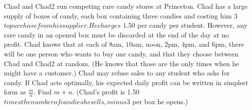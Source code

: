 Chad and Chad2 run competing rare candy stores at Princeton. Chad has a large supply of boxes of candy, each box containing three candies and costing him $ $3$ to purchase from his supplier. He charges $ $1.50$ per candy per student. However, any rare candy in an opened box must be discarded at the end of the day at no profit. Chad knows that at each of $8$am, $10$am, noon, $2$pm, $4$pm, and $6$pm, there will be one person who wants to buy one candy, and that they choose between Chad and Chad2 at random. (He knows that those are the only times when he might have a customer.) Chad may refuse sales to any student who asks for candy.
If Chad acts optimally, his expected daily profit can be written in simplest form as $\frac{m}{n}$. Find $m + n$. (Chad’s profit is $ $1.50$ times the number of candies he sells, minus $3 per box he  opens.)